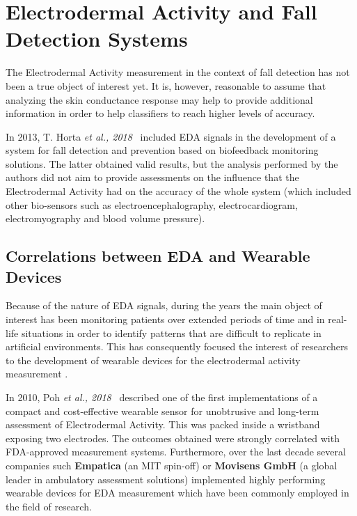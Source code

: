 \section{Electrodermal Activity and Fall Detection Systems}\label{sec:eda-fall-detection}

The Electrodermal Activity measurement in the context of fall detection has not been a true object of interest yet. It is, however, reasonable to assume that analyzing the skin conductance response may help to provide additional information in order to help classifiers to reach higher levels of accuracy. 

In 2013, T. Horta \textit{et al., 2018}~\cite{eda-fall-detection} included EDA signals in the development of a system for fall detection and prevention based on biofeedback monitoring solutions. The latter obtained valid results, but the analysis performed by the authors did not aim to provide assessments on the influence that the Electrodermal Activity had on the accuracy of the whole system (which included other bio-sensors such as electroencephalography, electrocardiogram, electromyography and blood volume pressure).

\subsection{Correlations between EDA and Wearable Devices}\label{subsec:eda-wearables}

Because of the nature of EDA signals, during the years the main object of interest has been monitoring patients over extended periods of time and in real-life situations in order to identify patterns that are difficult to replicate in artificial environments. This has consequently focused the interest of researchers to the development of wearable devices for the electrodermal activity measurement \cite{poh-wearable}. 

In 2010, Poh \textit{et al., 2018}~\cite{poh-wearable} described one of the first implementations of a compact and cost-effective wearable sensor for unobtrusive and long-term assessment of Electrodermal Activity. This was packed inside a wristband exposing two electrodes. The outcomes obtained were strongly correlated with FDA-approved measurement systems. Furthermore, over the last decade several companies such \textbf{Empatica} (an MIT spin-off) or \textbf{Movisens GmbH} (a global leader in ambulatory assessment solutions) implemented highly performing wearable devices for EDA measurement which have been commonly employed in the field of research.

